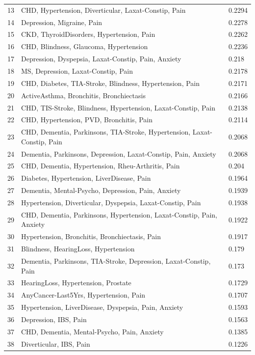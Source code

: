 \documentclass[12pt,]{report}
\begin{document}
\begin{table}[]
{\begin{tabular}{@{}lll@{}}
    13 & CHD, Hypertension, Diverticular, Laxat-Constip, Pain & 0.2294 \\
    14 & Depression, Migraine, Pain & 0.2278 \\
    15 & CKD, ThyroidDisorders, Hypertension, Pain & 0.2262 \\
    16 & CHD, Blindness, Glaucoma, Hypertension & 0.2236 \\
    17 & Depression, Dyspepsia, Laxat-Constip, Pain, Anxiety & 0.218 \\
    18 & MS, Depression, Laxat-Constip, Pain & 0.2178 \\
    19 & CHD, Diabetes, TIA-Stroke, Blindness, Hypertension, Pain & 0.2171 \\
    20 & ActiveAsthma, Bronchitis, Bronchiectasis & 0.2166 \\
    21 & CHD, TIS-Stroke, Blindness, Hypertension, Laxat-Constip, Pain & 0.2138 \\
    22 & CHD, Hypertension, PVD, Bronchitis, Pain & 0.2114 \\
    23 & CHD, Dementia, Parkinsons, TIA-Stroke, Hypertension, Laxat-Constip, Pain     & 0.2068 \\
    24 & Dementia, Parkinsons, Depression, Laxat-Constip, Pain, Anxiety & 0.2068      \\
    25 & CHD, Dementia, Hypertension, Rheu-Arthritis, Pain & 0.204 \\
    26 & Diabetes, Hypertension, LiverDisease, Pain & 0.1964 \\
    27 & Dementia, Mental-Psycho, Depression, Pain, Anxiety & 0.1939 \\
    28 & Hypertension, Diverticular, Dyspepsia, Laxat-Constip, Pain & 0.1938 \\
    29 & CHD, Dementia, Parkinsons, Hypertension, Laxat-Constip, Pain, Anxiety &      0.1922 \\
    30 & Hypertension, Bronchitis, Bronchiectasis, Pain & 0.1917 \\
    31 & Blindness, HearingLoss, Hypertension & 0.179 \\
    32 & Dementia, Parkinsons, TIA-Stroke, Depression, Laxat-Constip, Pain & 0.173     \\
    33 & HearingLoss, Hypertension, Prostate & 0.1729 \\
    34 & AnyCancer-Last5Yrs, Hypertension, Pain & 0.1707 \\
    35 & Hypertension, LiverDisease, Dyspepsia, Pain, Anxiety & 0.1593 \\
    36 & Depression, IBS, Pain & 0.1563 \\
    37 & CHD, Dementia, Mental-Psycho, Pain, Anxiety & 0.1385 \\
    38 & Diverticular, IBS, Pain & 0.1226 \\ \bottomrule
    \end{tabular}%
  }
\end{table}
\end{document}
